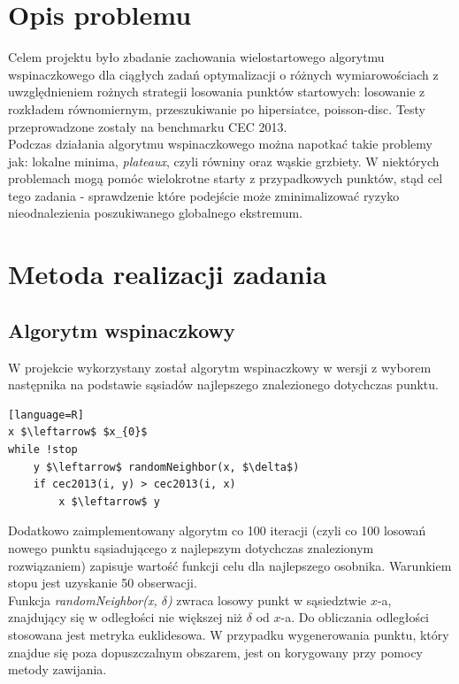 \documentclass{article}
\begin{document}
\section{Opis problemu}

Celem projektu było zbadanie zachowania wielostartowego algorytmu wspinaczkowego dla ciągłych zadań optymalizacji o różnych wymiarowościach z uwzględnieniem rożnych strategii losowania punktów startowych: losowanie z rozkładem równomiernym, przeszukiwanie po hipersiatce, poisson-disc. Testy przeprowadzone zostały na benchmarku CEC 2013.\\

Podczas działania algorytmu wspinaczkowego można napotkać takie problemy jak: lokalne minima, \textit{plateaux}, czyli równiny oraz wąskie grzbiety. W niektórych problemach mogą pomóc wielokrotne starty z przypadkowych punktów, stąd cel tego zadania - sprawdzenie które podejście może zminimalizować ryzyko nieodnalezienia poszukiwanego globalnego ekstremum.

\section{Metoda realizacji zadania}

\subsection{Algorytm wspinaczkowy}

W projekcie wykorzystany został algorytm wspinaczkowy w wersji z wyborem następnika na podstawie sąsiadów najlepszego znalezionego dotychczas punktu.

\begin{lstlisting}[mathescape][language=R]
x $\leftarrow$ $x_{0}$
while !stop
	y $\leftarrow$ randomNeighbor(x, $\delta$)
	if cec2013(i, y) > cec2013(i, x)
		x $\leftarrow$ y
\end{lstlisting}

Dodatkowo zaimplementowany algorytm co 100 iteracji (czyli co 100 losowań nowego punktu sąsiadującego z najlepszym dotychczas znalezionym rozwiązaniem) zapisuje wartość funkcji celu dla najlepszego osobnika. Warunkiem stopu jest uzyskanie 50 obserwacji.\\

Funkcja \textit{randomNeighbor(x, $\delta$)} zwraca losowy punkt w sąsiedztwie $x$-a, znajdujący się w odległości nie większej niż $\delta$ od $x$-a. Do obliczania odległości stosowana jest metryka euklidesowa. W przypadku wygenerowania punktu, który znajdue się poza dopuszczalnym obszarem, jest on korygowany przy pomocy metody zawijania.\\
\end{document}
